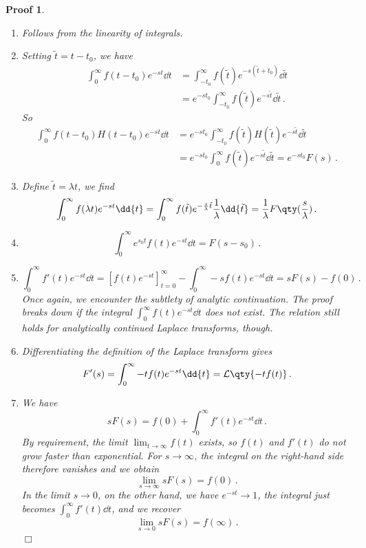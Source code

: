 \documentclass{article}
\theoremstyle{plain}\theoremheaderfont{\normalfont\itshape}\theorembodyfont{\rmfamily}\theoremseparator{.}\newtheorem*{rem}{Remark}\newtheorem*{ex}{Example}\newtheorem*{proof}{Proof}\newtheorem*{altp}{Alternative proof}
\theoremstyle{plain}\theoremheaderfont{\normalfont\bfseries}\theorembodyfont{\rmfamily}\theoremseparator{.}\newtheorem{thm}{Theorem}[section]\newtheorem{lem}[thm]{Lemma}\newtheorem{prop}[thm]{Proposition}\newtheorem*{cor}{Corollary}\newtheorem{defn}[thm]{Definition}\newtheorem{clm}[thm]{Claim}\newtheorem{clminproof}{Claim}
\theoremstyle{break}\theoremheaderfont{\normalfont\itshape}\theorembodyfont{\rmfamily}\theoremseparator{.\medskip}\newtheorem*{proofskip}{Proof}\newtheorem*{exs}{Examples}\newtheorem*{rems}{Remarks}
\theoremstyle{break}\theoremheaderfont{\normalfont\bfseries}\theorembodyfont{\rmfamily}\theoremseparator{.\medskip}\newtheorem{lemskip}[thm]{Lemma}\newtheorem{defnskip}[thm]{Definition}\newtheorem{propskip}[thm]{Proposition}\newtheorem{thmskip}[thm]{Theorem}
\numberwithin{equation}{section}
\newcommand{\qed}{\hfill\ensuremath{\Box}}
\newcommand{\lt}[1]{\mathcal{L}\qty{ #1 }}
\begin{document}
	\begin{proofskip}
		\begin{enumerate}[topsep=0pt]
			\item[(i)] Follows from the linearity of integrals.
			\item[(ii)] Setting \(\tilde{t}=t-t_0\), we have
			\begin{align*}
				\int_{0}^{\infty}f(t-t_0)e^{-st}\dd{t}&=\int_{-t_0}^{\infty}f(\tilde{t})e^{-s(\tilde{t}+t_0)}\dd{\tilde{t}}\\
				&=e^{-st_0}\int_{-t_0}^{\infty}f(\tilde{t})e^{-s\tilde{t}}\dd{\tilde{t}}\,.
			\end{align*}
			So
			\begin{align*}
				\int_{0}^{\infty}f(t-t_0)H(t-t_0)e^{-st}\dd{t}&=e^{-st_0}\int_{-t_0}^{\infty}f(\tilde{t})H(\tilde{t})e^{-s\tilde{t}}\dd{\tilde{t}}\\
				&=e^{-st_0}\int_{0}^{\infty}f(\tilde{t})e^{-s\tilde{t}}\dd{\tilde{t}}=e^{-st_0}F(s)\,.
			\end{align*}
			\item[(iii)] Define \(\tilde{t}=\lambda t\), we find
			\[\int_{0}^{\infty}f(\lambda t)e^{-st}\dd{t}=\int_{0}^{\infty}f(\tilde{t})e^{-\frac{s}{\lambda}\tilde{t}}\frac{1}{\lambda}\dd{\tilde{t}}=\frac{1}{\lambda}F\qty(\frac{s}{\lambda})\,.\]
			\item[(iv)] 
			\[\int_{0}^{\infty}e^{s_0 t}f(t)e^{-st}\dd{t}=F(s-s_0)\,.\]
			\item[(v)]
			\[\int_{0}^{\infty}f'(t)e^{-st}\dd{t}=[f(t)e^{-st}]_{t=0}^\infty-\int_{0}^{\infty}-sf(t)e^{-st}\dd{t}=sF(s)-f(0)\,.\]
			Once again, we encounter the subtlety of analytic continuation. The proof breaks down if the integral \(\int_{0}^{\infty} f(t)e^{-st}\dd{t}\) does not exist. The relation still holds for analytically continued Laplace transforms, though.
			\item[(vi)] Differentiating the definition of the Laplace transform gives
			\[F'(s)=\int_{0}^{\infty}-tf(t)e^{-st}\dd{t}=\lt{-tf(t)}\,.\]
			\item[(vii)] We have
			\[sF(s)=f(0)+\int_{0}^{\infty}f'(t)e^{-st}\dd{t}\,.\]
			By requirement, the limit \(\lim_{t\to\infty}f(t)\) exists, so \(f(t)\) and \(f'(t)\) do not grow faster than exponential. For \(s\to\infty\), the integral on the right-hand side therefore vanishes and we obtain
			\[\lim_{s\to \infty}sF(s)=f(0)\,.\]
			In the limit \(s\to 0\), on the other hand, we have \(e^{-st}\to 1\), the integral just becomes \(\int_0^\infty f'(t)\dd{t}\), and we recover
			\[\lim_{s\to 0}sF(s)=f(\infty)\,.\]\qed
		\end{enumerate}
	\end{proofskip}
\end{document}
